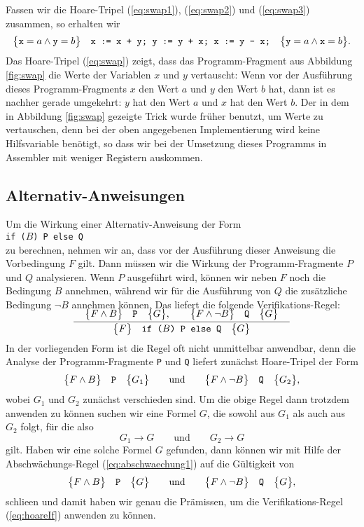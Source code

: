 Fassen wir die Hoare-Tripel (\ref{eq:swap1}), (\ref{eq:swap2}) und (\ref{eq:swap3})
zusammen, so erhalten wir
\begin{equation}
  \label{eq:swap}
  \bigl\{\texttt{x} = a \wedge \texttt{y} = b\bigr\}\quad\texttt{x := x + y; y := y + x; x := y - x;}\quad\bigl\{ 
         \texttt{y} = a \wedge \texttt{x} = b\bigr\}.   
\end{equation}
Das Hoare-Tripel (\ref{eq:swap}) zeigt, dass das Programm-Fragment aus Abbildung
\ref{fig:swap} die Werte der Variablen $x$ und $y$ vertauscht: Wenn vor der Ausf\"uhrung
dieses Programm-Fragments $x$ den Wert $a$ und $y$ den Wert $b$ hat, dann ist es nachher
gerade umgekehrt: $y$ hat den Wert $a$ und $x$ hat den Wert $b$.  Der in dem in Abbildung
\ref{fig:swap} gezeigte Trick wurde fr\"uher 
benutzt, um  Werte zu vertauschen, denn bei der oben angegebenen
Implementierung wird keine Hilfsvariable ben\"otigt, so dass wir bei der Umsetzung dieses
Programms in Assembler mit weniger Registern auskommen.

\subsection{Alternativ-Anweisungen}
Um die Wirkung einer Alternativ-Anweisung der Form 
\\[0.2cm]
\hspace*{1.3cm}
\texttt{if ($B$)  P  else  Q }
\\[0.2cm]
zu berechnen, nehmen wir an, dass vor der Ausf\"uhrung dieser Anweisung die Vorbedingung
$F$ gilt.  Dann m\"ussen wir die Wirkung der Programm-Fragmente $P$ und $Q$ analysieren.
Wenn $P$ ausgef\"uhrt wird, k\"onnen wir neben $F$ noch die Bedingung $B$ annehmen, w\"ahrend
wir f\"ur die Ausf\"uhrung von $Q$ die zus\"atzliche Bedingung $\neg B$ annehmen k\"onnen.
Das liefert die folgende Verifikations-Regel:
\begin{equation}
  \label{eq:hoareIf}
  \bruch{\quad\hoare{F \wedge B}{P}{G}, \qquad \hoare{F \wedge \neg B}{Q}{G}\quad}{
              \hoare{F}{if ($B$) P else Q}{G}}  
\end{equation}
In der vorliegenden Form ist die Regel oft nicht unmittelbar anwendbar, denn die Analyse
der Programm-Fragmente \texttt{P} und \texttt{Q} liefert zun\"achst Hoare-Tripel der Form
\begin{equation}
  \label{eq:abschwaechung1}
 \bigl\{F \wedge B\bigr\}\quad\texttt{P}\quad\bigl\{G_1\bigr\} \qquad \mathrm{und} \qquad \bigl\{F \wedge \neg B\bigr\}\quad\texttt{Q}\quad\bigl\{G_2\bigr\},   
\end{equation}
wobei $G_1$ und $G_2$ zun\"achst verschieden sind.   Um die obige Regel dann trotzdem
anwenden zu k\"onnen suchen wir eine Formel $G$, die sowohl aus $G_1$ als auch aus $G_2$
folgt, f\"ur die also
\[ G_1 \rightarrow G \qquad \mathrm{und} \qquad G_2 \rightarrow G \]
gilt.  Haben wir eine solche Formel $G$ gefunden, dann k\"onnen wir mit Hilfe der
Abschw\"achungs-Regel (\ref{eq:abschwaechung1})
auf die G\"ultigkeit von
\[ \bigl\{F \wedge B\bigr\}\quad\texttt{P}\quad\bigl\{G\bigr\} \qquad \mathrm{und} \qquad \bigl\{F \wedge \neg B\bigr\}\quad\texttt{Q}\quad\bigl\{G\bigr\},    \] 
schlie\3en und damit haben wir genau die Pr\"amissen, um die 
Verifikations-Regel (\ref{eq:hoareIf}) anwenden zu k\"onnen.
\vspace*{0.3cm}

